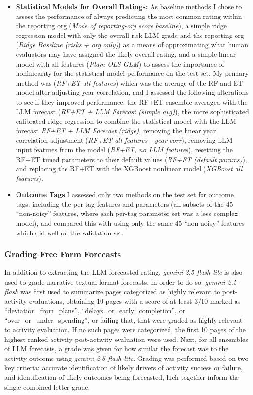 \begin{itemize}
  \item \textbf{ Statistical Models for Overall Ratings:} As baseline methods I chose to assess the performance of always predicting the most common rating within the reporting org (\emph{Mode of reporting-org score baseline}), a simple ridge regression model with only the overall risk LLM grade and the reporting org (\emph{Ridge Baseline (risks + org only)}) as a means of approximating what human evaluators may have assigned the likely overall rating, and a simple linear model with all features (\emph{Plain OLS GLM}) to assess the importance of nonlinearity for the statistical model performance on the test set. My primary method was (\emph{RF+ET all features}) which was the average of the RF and ET model after adjusting year correlation, and I assessed the following alterations to see if they improved performance: the RF+ET ensemble averaged with the LLM forecast (\emph{RF+ET + LLM Forecast (simple avg)}), the more sophisticated calibrated ridge regression to combine the statistical model with the LLM forecast \emph{RF+ET + LLM Forecast (ridge)}, removing the linear year correlation adjustment (\emph{RF+ET all features - year corr}), removing LLM input features from the model (\emph{RF+ET, no LLM features}), resetting the RF+ET tuned parameters to their default values (\emph{RF+ET (default params)}), and replacing the RF+ET with the XGBoost nonlinear model (\emph{XGBoost all features}).

  \item \textbf{Outcome Tags} I assessed only two methods on the test set for outcome tags: including the per-tag features and parameters (all subsets of the 45 ``non-noisy'' features, where each per-tag parameter set was a less complex model), and compared this with using only the same 45 ``non-noisy'' features which did well on the validation set.

\end{itemize}

\subsubsection{Grading Free Form Forecasts}
In addition to extracting the LLM forecasted rating, \emph{gemini-2.5-flash-lite} is also used to grade narrative textual format forecasts. In order to do so, \emph{gemini-2.5-flash} was first used to summarize pages categorized as highly relevant to post-activity evaluations, obtaining 10 pages with a score of at least 3/10 marked as ``deviation\_from\_plans'', ``delays\_or\_early\_completion'', or ``over\_or\_under\_spending'', or failing that, that were graded as highly relevant to activity evaluation. If no such pages were categorized, the first 10 pages of the highest ranked activity post-activity evaluation were used. Next, for all ensembles of LLM forecasts, a grade was given for how similar the forecast was to the activity outcome using \emph{gemini-2.5-flash-lite}. Grading was performed based on two key criteria: accurate identification of likely drivers of activity success or failure, and identification of likely outcomes being forecasted,  hich together inform the single combined letter grade.

